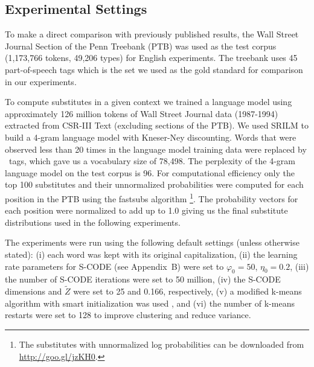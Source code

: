 \subsection{Experimental Settings}
\label{sec:expset}

To make a direct comparison with previously published results,
the Wall Street Journal Section of the Penn Treebank (PTB) \cite{treebank3}
was used as the test corpus (1,173,766 tokens, 49,206 types) for
English experiments.
The treebank uses 45 part-of-speech tags which is the set we used as
the gold standard for comparison in our experiments.

To compute substitutes in a given context we trained a language model
using approximately 126 million tokens of Wall Street Journal data
(1987-1994) extracted from CSR-III Text \cite{csr3text} (excluding
sections of the PTB).
We used SRILM \cite{Stolcke2002} to build a 4-gram language model with
Kneser-Ney discounting.
Words that were observed less than 20 times in the language model
training data were replaced by \unk\ tags, which gave us a
vocabulary size of 78,498.
The perplexity of the 4-gram language model on the test corpus is 96.
For computational efficiency only the top 100 substitutes and their
unnormalized probabilities were computed for each position in the PTB
using the {\sc fastsubs} algorithm
\cite{yuret2012fastsub}\footnote{The substitutes with unnormalized log
  probabilities can be downloaded from
  \mbox{\url{http://goo.gl/jzKH0}}.}.  The probability vectors for
each position were normalized to add up to 1.0 giving us the final
substitute distributions used in the following experiments.

The experiments were run using the following default settings (unless
otherwise stated): (i) each word was kept with its original
capitalization, (ii) the learning rate parameters for S-CODE (see
Appendix~B)
were set to $\varphi_0=50$, $\eta_0=0.2$,
(iii) the number of S-CODE iterations were set to 50 million, (iv) the
S-CODE dimensions and $\tilde{Z}$ were set to 25 and 0.166,
respectively, (v) a modified k-means algorithm with smart
initialization was used \cite{arthur2007k}, and (vi) the number of
k-means restarts were set to 128 to improve clustering and reduce
variance.

